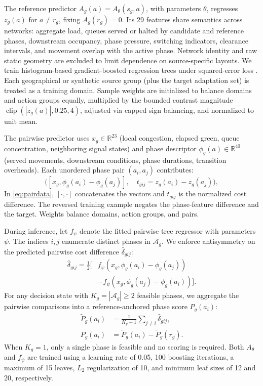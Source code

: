\documentclass[letterpaper,journal]{IEEEtran}
\newcommand{\R}{\mathbb{R}}
\begin{document}
The reference predictor $A_g(a)=A_\theta(s_g,a)$, with parameters $\theta$, regresses $z_g(a)$ for $a\ne r_g$, fixing $A_g(r_g)=0$. Its 29 features share semantics across networks: aggregate load, queues served or halted by candidate and reference phases, downstream occupancy, phase pressure, switching indicators, clearance intervals, and movement overlap with the active phase. Network identity and raw static geometry are excluded to limit dependence on source-specific layouts. We train histogram-based gradient-boosted regression trees under squared-error loss \cite{friedman2001greedy,pedregosa2011scikit}. Each geographical or synthetic source group (plus the target adaptation set) is treated as a training domain. Sample weights are initialized to balance domains and action groups equally, multiplied by the bounded contrast magnitude $\operatorname{clip}(|z_g(a)|,0.25,4)$, adjusted via capped sign balancing, and normalized to unit mean.

The pairwise predictor uses $x_g\in\R^{23}$ (local congestion, elapsed green, queue concentration, neighboring signal states) and phase descriptor $\phi_g(a)\in\R^{40}$ (served movements, downstream conditions, phase durations, transition overheads). Each unordered phase pair $(a_i,a_j)$ contributes:
\begin{equation}
 \bigl([x_g,\phi_g(a_i)-\phi_g(a_j)],\quad
 t_{gij}=z_g(a_i)-z_g(a_j)\bigr),
 \label{eq:pairdata}
\end{equation}
In \eqref{eq:pairdata}, $[\cdot,\cdot]$ concatenates the vectors and $t_{gij}$ is the normalized cost difference. The reversed training example negates the phase-feature difference and the target. Weights balance domains, action groups, and pairs.

During inference, let $f_\psi$ denote the fitted pairwise tree regressor with parameters $\psi$. The indices $i,j$ enumerate distinct phases in $\mathcal A_g$. We enforce antisymmetry on the predicted pairwise cost difference $\widehat\delta_{gij}$:
\begin{equation}
 \begin{split}
 \widehat\delta_{gij}=\tfrac12\bigl[&
 f_\psi(x_g,\phi_g(a_i)-\phi_g(a_j))\\
 &-f_\psi(x_g,\phi_g(a_j)-\phi_g(a_i))\bigr].
 \end{split}
 \label{eq:antisym}
\end{equation}
For any decision state with $K_g=|\mathcal A_g|\geq2$ feasible phases, we aggregate the pairwise comparisons into a reference-anchored phase score $P_g(a_i)$:
\begin{align}
 \widetilde P_g(a_i)&=\frac{1}{K_g-1}\sum_{j\ne i}\widehat\delta_{gij},\nonumber\\
 P_g(a_i)&=\widetilde P_g(a_i)-\widetilde P_g(r_g).
 \label{eq:pairscore}
\end{align}
When $K_g=1$, only a single phase is feasible and no scoring is required. Both $A_\theta$ and $f_\psi$ are trained using a learning rate of 0.05, 100 boosting iterations, a maximum of 15 leaves, $L_2$ regularization of 10, and minimum leaf sizes of 12 and 20, respectively.
\end{document}
